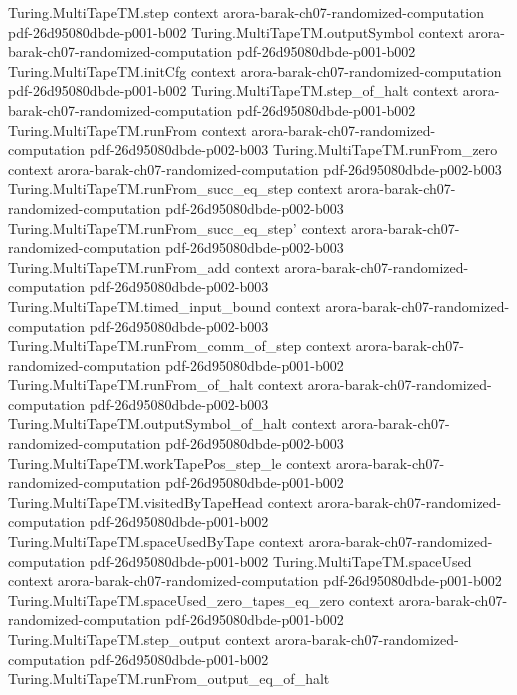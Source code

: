 \begin{theorem}
  {Turing.MultiTapeTM.step}
  {context}
  {arora-barak-ch07-randomized-computation}
  {pdf-26d95080dbde-p001-b002}
\proofstep
  {Turing.MultiTapeTM.outputSymbol}
  {context}
  {arora-barak-ch07-randomized-computation}
  {pdf-26d95080dbde-p001-b002}
\proofstep
  {Turing.MultiTapeTM.initCfg}
  {context}
  {arora-barak-ch07-randomized-computation}
  {pdf-26d95080dbde-p001-b002}
\proofstep
  {Turing.MultiTapeTM.step_of_halt}
  {context}
  {arora-barak-ch07-randomized-computation}
  {pdf-26d95080dbde-p001-b002}
\proofstep
  {Turing.MultiTapeTM.runFrom}
  {context}
  {arora-barak-ch07-randomized-computation}
  {pdf-26d95080dbde-p002-b003}
\proofstep
  {Turing.MultiTapeTM.runFrom_zero}
  {context}
  {arora-barak-ch07-randomized-computation}
  {pdf-26d95080dbde-p002-b003}
\proofstep
  {Turing.MultiTapeTM.runFrom_succ_eq_step}
  {context}
  {arora-barak-ch07-randomized-computation}
  {pdf-26d95080dbde-p002-b003}
\proofstep
  {Turing.MultiTapeTM.runFrom_succ_eq_step'}
  {context}
  {arora-barak-ch07-randomized-computation}
  {pdf-26d95080dbde-p002-b003}
\proofstep
  {Turing.MultiTapeTM.runFrom_add}
  {context}
  {arora-barak-ch07-randomized-computation}
  {pdf-26d95080dbde-p002-b003}
\proofstep
  {Turing.MultiTapeTM.timed_input_bound}
  {context}
  {arora-barak-ch07-randomized-computation}
  {pdf-26d95080dbde-p002-b003}
\proofstep
  {Turing.MultiTapeTM.runFrom_comm_of_step}
  {context}
  {arora-barak-ch07-randomized-computation}
  {pdf-26d95080dbde-p001-b002}
\proofstep
  {Turing.MultiTapeTM.runFrom_of_halt}
  {context}
  {arora-barak-ch07-randomized-computation}
  {pdf-26d95080dbde-p002-b003}
\proofstep
  {Turing.MultiTapeTM.outputSymbol_of_halt}
  {context}
  {arora-barak-ch07-randomized-computation}
  {pdf-26d95080dbde-p002-b003}
\proofstep
  {Turing.MultiTapeTM.workTapePos_step_le}
  {context}
  {arora-barak-ch07-randomized-computation}
  {pdf-26d95080dbde-p001-b002}
\proofstep
  {Turing.MultiTapeTM.visitedByTapeHead}
  {context}
  {arora-barak-ch07-randomized-computation}
  {pdf-26d95080dbde-p001-b002}
\proofstep
  {Turing.MultiTapeTM.spaceUsedByTape}
  {context}
  {arora-barak-ch07-randomized-computation}
  {pdf-26d95080dbde-p001-b002}
\proofstep
  {Turing.MultiTapeTM.spaceUsed}
  {context}
  {arora-barak-ch07-randomized-computation}
  {pdf-26d95080dbde-p001-b002}
\proofstep
  {Turing.MultiTapeTM.spaceUsed_zero_tapes_eq_zero}
  {context}
  {arora-barak-ch07-randomized-computation}
  {pdf-26d95080dbde-p001-b002}
\proofstep
  {Turing.MultiTapeTM.step_output}
  {context}
  {arora-barak-ch07-randomized-computation}
  {pdf-26d95080dbde-p001-b002}
\proofstep
  {Turing.MultiTapeTM.runFrom_output_eq_of_halt}

\end{theorem}
